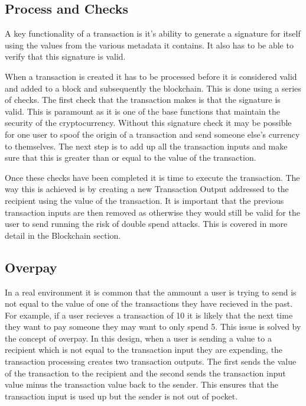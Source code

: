 \documentclass{l4proj}
\begin{document}
\subsection{Process and Checks}
A key functionality of a transaction is it's ability to generate a signature for itself using the values
from the various metadata it contains. It also has to be able to verify that this signature is valid.

When a transaction is created it has to be processed before it is considered valid and added to a block and subsequently
the blockchain. This is done using a series of checks. The first check that the transaction makes is that the
signature is valid. This is paramount as it is one of the base functions that maintain the security of the 
cryptocurrency. Without this signature check it may be possible for one user to spoof the origin of a transaction
and send someone else's currency to themselves. The next step is to add up all the transaction inputs
and make sure that this is greater than or equal to the value of the transaction.

Once these checks have been completed it is time to execute the transaction. The way this is achieved is by
creating a new Transaction Output addressed to the recipient using the value of the transaction. It is important
that the previous transaction inputs are then removed as otherwise they would still be valid for the user to send
running the risk of double spend attacks. This is covered in more detail in the Blockchain section.

\subsection{Overpay}
In a real environment it is common that the ammount a user is trying to send is not equal to the value of one of
the transactions they have recieved in the past. For example, if a user recieves a transaction of 10 it is likely
that the next time they want to pay someone they may want to only spend 5. This issue is solved by the concept of
overpay. In this design, when a user is sending a value to a recipient which is not equal to the transaction
input they are expending, the transaction processing creates two transaction outputs. The first sends the value
of the transaction to the recipient and the second sends the transaction input value minus the transaction value
back to the sender. This ensures that the transaction input is used up but the sender is not out of pocket.
\end{document}
